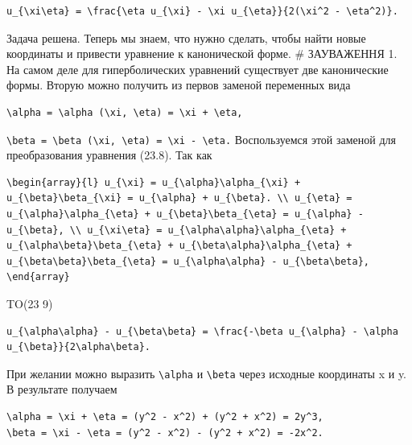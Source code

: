 \documentclass[
  ukrainian,
]{article}
\begin{document}
\begin{verbatim}
u_{\xi\eta} = \frac{\eta u_{\xi} - \xi u_{\eta}}{2(\xi^2 - \eta^2)}.
\end{verbatim}

Задача решена. Теперь мы знаем, что нужно сделать, чтобы найти новые
координаты и привести уравнение к канонической форме. \# ЗАУВАЖЕННЯ 1.
На самом деле для гиперболических уравнений существует две канонические
формы. Вторую можно получить из первов заменой переменных вида

\begin{verbatim}
\alpha = \alpha (\xi, \eta) = \xi + \eta,
\end{verbatim}

\texttt{\textbackslash{}beta\ =\ \textbackslash{}beta\ (\textbackslash{}xi,\ \textbackslash{}eta)\ =\ \textbackslash{}xi\ -\ \textbackslash{}eta.}
Воспользуемся этой заменой для преобразования уравнения (23.8). Так как

\begin{verbatim}
\begin{array}{l} u_{\xi} = u_{\alpha}\alpha_{\xi} + u_{\beta}\beta_{\xi} = u_{\alpha} + u_{\beta}. \\ u_{\eta} = u_{\alpha}\alpha_{\eta} + u_{\beta}\beta_{\eta} = u_{\alpha} - u_{\beta}, \\ u_{\xi\eta} = u_{\alpha\alpha}\alpha_{\eta} + u_{\alpha\beta}\beta_{\eta} + u_{\beta\alpha}\alpha_{\eta} + u_{\beta\beta}\beta_{\eta} = u_{\alpha\alpha} - u_{\beta\beta}, \end{array}
\end{verbatim}

TO(23 9)

\begin{verbatim}
u_{\alpha\alpha} - u_{\beta\beta} = \frac{-\beta u_{\alpha} - \alpha u_{\beta}}{2\alpha\beta}.
\end{verbatim}

При желании можно выразить \texttt{\textbackslash{}alpha} и
\texttt{\textbackslash{}beta} через исходные координаты x и y. В
результате получаем

\begin{verbatim}
\alpha = \xi + \eta = (y^2 - x^2) + (y^2 + x^2) = 2y^3,
\beta = \xi - \eta = (y^2 - x^2) - (y^2 + x^2) = -2x^2.
\end{verbatim}
\end{document}
